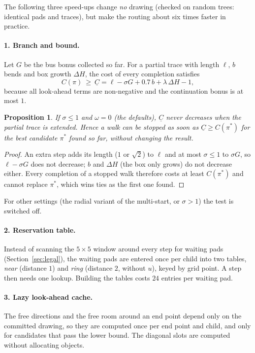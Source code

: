 \documentclass[11pt,a4paper]{article}
\newtheorem{proposition}{Proposition}
\theoremstyle{remark}
\begin{document}
The following three speed-ups change \emph{no} drawing (checked on random trees: identical pads and traces), but
make the routing about six times faster in practice.

\paragraph{1. Branch and bound.} Let $G$ be the bus bonus collected so far. For a partial trace with length $\ell$,
$b$ bends and box growth $\Delta H$, the cost of every completion satisfies
\[
C(\pi)\ \ge\ \underline{C}=\ell-\sigma G+0.7\,b+\lambda\,\Delta H-1,
\]
because all look-ahead terms are non-negative and the continuation bonus is at most $1$.
\begin{proposition}
If $\sigma\le 1$ and $\omega=0$ (the defaults), $\underline C$ never decreases when the partial trace is extended.
Hence a walk can be stopped as soon as $\underline C\ge C(\pi^\ast)$ for the best candidate $\pi^\ast$ found so far,
without changing the result.
\end{proposition}
\begin{proof}
An extra step adds its length ($1$ or $\sqrt 2$) to $\ell$ and at most $\sigma\le1$ to $\sigma G$, so
$\ell-\sigma G$ does not decrease; $b$ and $\Delta H$ (the box only grows) do not decrease either. Every completion of a
stopped walk therefore costs at least $C(\pi^\ast)$ and cannot replace $\pi^\ast$, which wins ties as the first one
found.
\end{proof}
For other settings (the radial variant of the multi-start, or $\sigma>1$) the test is switched off.

\paragraph{2. Reservation table.} Instead of scanning the $5\times5$ window around every step for waiting pads
(Section~\ref{sec:legal}), the waiting pads are entered once per child into two tables, \emph{near} (distance $1$) and
\emph{ring} (distance $2$, without $u$), keyed by grid point. A step then needs one lookup. Building the tables costs
$24$ entries per waiting pad.

\paragraph{3. Lazy look-ahead cache.} The free directions and the free room around an end point depend only on the
committed drawing, so they are computed once per end point and child, and only for candidates that pass the lower
bound. The diagonal slots are computed without allocating objects.
\end{document}
